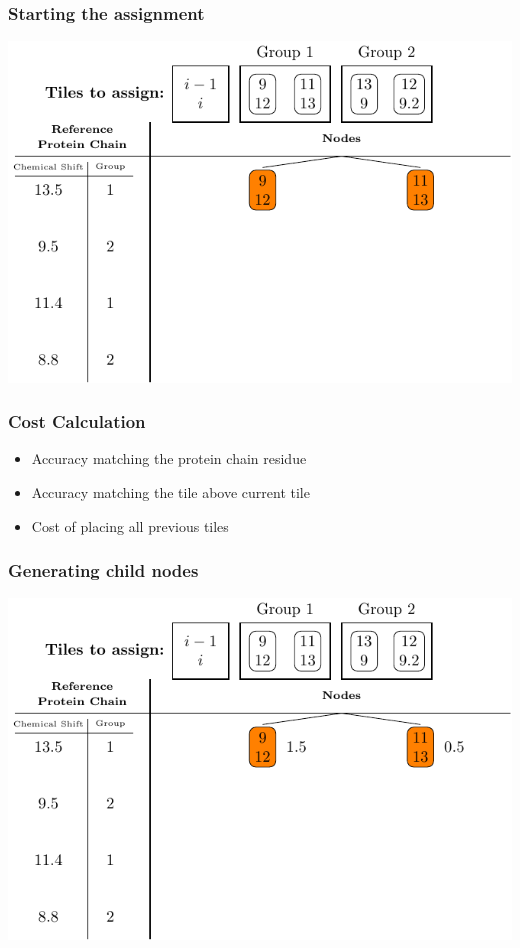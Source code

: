 \documentclass{beamer}
\begin{document}
\begin{frame}
	\frametitle{Starting the assignment}
	\vspace{-.5cm}
	\center
	\includegraphics[width=.9\textwidth]{tilePlacement/step2}
\end{frame}

\begin{frame}
	\frametitle{Cost Calculation}
	\begin{itemize}
		\item Accuracy matching the protein chain residue
		\item Accuracy matching the tile above current tile
		\item Cost of placing all previous tiles
	\end{itemize}
\end{frame}

\begin{frame}
	\frametitle{Generating child nodes}
	\vspace{-.5cm}
	\center
	\includegraphics[width=.9\textwidth]{tilePlacement/step3}
\end{frame}
\end{document}
